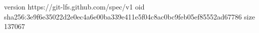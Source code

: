 version https://git-lfs.github.com/spec/v1
oid sha256:3e9f6e35022d2e0ec4a6e00ba339e411e5f04c8ac0bc9feb05ef85552ad67786
size 137067

